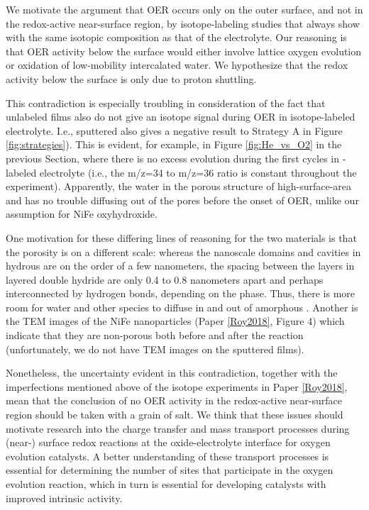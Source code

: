 We motivate the argument that OER occurs only on the outer surface, and not in the redox-active near-surface region, by isotope-labeling studies that always show  with the same isotopic composition as that of the electrolyte. Our reasoning is that OER activity below the surface would either involve lattice oxygen evolution or oxidation of low-mobility intercalated water. We hypothesize that the redox activity below the surface is only due to proton shuttling.

This contradiction is especially troubling in consideration of the fact that unlabeled  films also do not give an isotope signal during OER in isotope-labeled electrolyte. I.e., sputtered  also gives a negative result to Strategy A in Figure \ref{fig:strategies}). This is evident, for example, in Figure \ref{fig:He_vs_O2} in the previous Section, where there is no excess  evolution during the first cycles in -labeled electrolyte (i.e., the m/z=34 to m/z=36 ratio is constant throughout the experiment). Apparently, the water in the porous structure of high-surface-area  and  has no trouble diffusing out of the pores before the onset of OER, unlike our assumption for NiFe oxyhydroxide.

One motivation for these differing lines of reasoning for the two materials is that the porosity is on a different scale: whereas the nanoscale domains and cavities in hydrous  are on the order of a few nanometers\cite{Yoshida2013}, the spacing between the layers in  layered double hydride are only 0.4 to 0.8 nanometers apart and perhaps interconnected by hydrogen bonds, depending on the phase\cite{Dionigi2016b}. Thus, there is more room for water and other species to diffuse in and out of amorphous . Another is the TEM images of the NiFe nanoparticles (Paper \ref{Roy2018}, Figure 4) which indicate that they are non-porous both before and after the reaction (unfortunately, we do not have TEM images on the sputtered  films).

Nonetheless, the uncertainty evident in this contradiction, together with the imperfections mentioned above of the isotope experiments in Paper \ref{Roy2018}, mean that the conclusion of no OER activity in the redox-active near-surface region should be taken with a grain of salt. We think that these issues should motivate research into the charge transfer and mass transport processes during (near-) surface redox reactions at the oxide-electrolyte interface for oxygen evolution catalysts. A better understanding of these transport processes is essential for determining the number of sites that participate in the oxygen evolution reaction, which in turn is essential for developing catalysts with improved intrinsic activity\cite{Kibsgaard2019}. 

